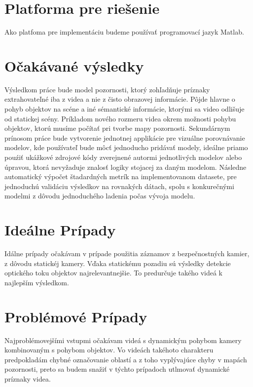 \section{Platforma pre riešenie}
Ako platfoma pre implementáciu budeme používať programovací jazyk Matlab.
\section{Očakávané výsledky}
Výsledkom práce bude model pozornosti, ktorý zohľadňuje príznaky extrahovateľné iba z videa a nie z čisto obrazovej informácie.
Pôjde hlavne o pohyb objektov na scéne a iné sémantické informácie, ktorými sa video odlišuje od statickej scény.
Príkladom nového rozmeru videa okrem možnosti pohybu objektov, ktorú musíme počítať pri tvorbe mapy pozornosti.
Sekundárnym prínosom práce bude vytvorenie jednotnej applikácie pre vizuálne porovnávanie modelov, kde používateľ bude môcť jednoducho pridávať modely, ideálne priamo pouźiť ukážkové zdrojové kódy zverejnené autormi jednotlivých modelov alebo úpravou, ktorá nevyžaduje znalosť logiky stojacej za daným modelom.
Následne automatický výpočet štadardných metrík na implementovanom datasete, pre jednoduchú validáciu výsledkov na rovnakých dátach, spolu s konkurečnými modelmi z dôvodu jednoduchého ladenia počas vývoja modelu.
\section{Ideálne Prípady}
Idálne prípady očakávam v prípade použitia záznamov z bezpečnostných kamier, z dôvodu statickéj kamery.
Vďaka statickému pozadiu sú výsledky detekcie optického toku objektov najrelevantnejšie.
To predurčuje takého videá k najlepším výsledkom.
\section{Problémové Prípady}
Najproblémovejšími vstupmi očakávam videá s dynamickým pohybom kamery kombinovaným s pohybom objektov.
Vo videách takéhoto charakteru predpokladám chybné označovanie oblastí a z toho vyplývajúce chyby v mapách pozornosti, preto sa budem snažiť v týchto prípadoch utlmovať dynamické príznaky videa.
